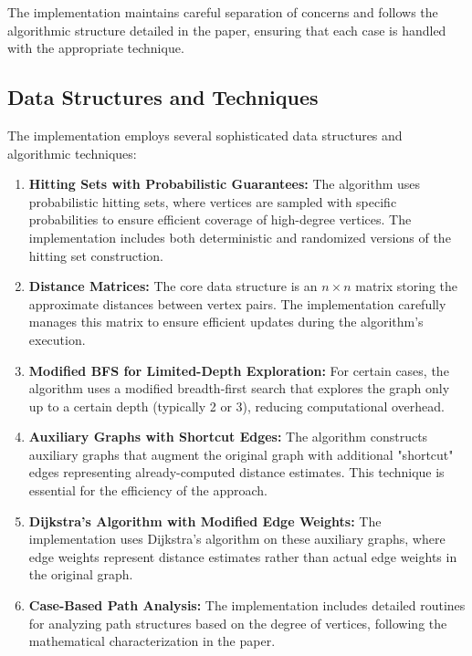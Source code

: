 \documentclass[a4paper,11pt,oneside]{book}
\begin{document}
The implementation maintains careful separation of concerns and follows the algorithmic structure detailed in the paper, ensuring that each case is handled with the appropriate technique.\\

\subsection{Data Structures and Techniques}

The implementation employs several sophisticated data structures and algorithmic techniques:\\

\begin{enumerate}
    \item \textbf{Hitting Sets with Probabilistic Guarantees:} The algorithm uses probabilistic hitting sets, where vertices are sampled with specific probabilities to ensure efficient coverage of high-degree vertices. The implementation includes both deterministic and randomized versions of the hitting set construction.
    
    \item \textbf{Distance Matrices:} The core data structure is an $n \times n$ matrix storing the approximate distances between vertex pairs. The implementation carefully manages this matrix to ensure efficient updates during the algorithm's execution.
    
    \item \textbf{Modified BFS for Limited-Depth Exploration:} For certain cases, the algorithm uses a modified breadth-first search that explores the graph only up to a certain depth (typically 2 or 3), reducing computational overhead.
    
    \item \textbf{Auxiliary Graphs with Shortcut Edges:} The algorithm constructs auxiliary graphs that augment the original graph with additional "shortcut" edges representing already-computed distance estimates. This technique is essential for the efficiency of the approach.
    
    \item \textbf{Dijkstra's Algorithm with Modified Edge Weights:} The implementation uses Dijkstra's algorithm on these auxiliary graphs, where edge weights represent distance estimates rather than actual edge weights in the original graph.
    
    \item \textbf{Case-Based Path Analysis:} The implementation includes detailed routines for analyzing path structures based on the degree of vertices, following the mathematical characterization in the paper.
\end{enumerate}
\end{document}
